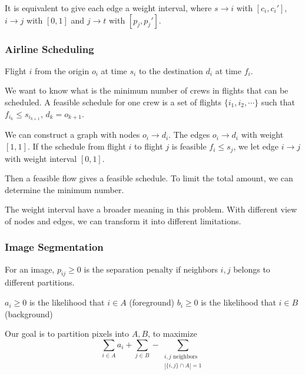It is equivalent to give each edge a weight interval, where  $ s\to i $ with  $ [c_i,c_i'] $,  $ i\to j $ with  $ [0,1] $ and  $ j\to t $ with  $ [p_j,p_j'] $.

\subsubsection{Airline Scheduling}

\begin{example}
    Flight $ i $ from the origin  $ o_i $  at time  $ s_i $ to the destination  $ d_i $ at  time  $ f_i $.
    
    We want to know what is the minimum number of crews in flights that can be scheduled. A feasible schedule for one crew is a set of flights  $ \{i_1,i_2,\cdots\} $ such that  $ f_{i_k} \leq s_{i_{k+1}} $,  $ d_k=o_{k+1} $.   
\end{example}

We can construct a graph with nodes  $ o_i\to d_i $. The edges   $ o_i\to d_i $ with weight  $ [1,1] $. If the schedule from flight  $ i $ to flight  $ j $ is feasible \ie  $ f_i \leq s_j $, we let edge $ i\to j $ with weight interval  $ [0,1] $.

Then a feasible flow gives a feasible schedule. To limit the total amount, we can determine the minimum number.

\begin{remark}
    The weight interval have a broader meaning in this problem. With different view of nodes and edges, we can transform it into different limitations.
\end{remark}

\subsubsection{Image Segmentation}

\begin{example}
    For an   image,  $ p_{ij} \geq 0 $ is the separation penalty if neighbors $ i,j $ belongs to different partitions. 
    
    $ a_i \geq 0 $ is the likelihood that  $ i\in A $ (foreground)
    $ b_i \geq 0 $ is the likelihood that $ i\in B $ (background)
    
    Our goal is to partition pixels into  $ A,B $, to maximize 
    \[\sum_{i\in A}a_i+\sum_{j\in B}-\sum_{\substack{i,j\text{ neighbors}\\|\{i,j\}\cap A|=1}}\] 
\end{example}

